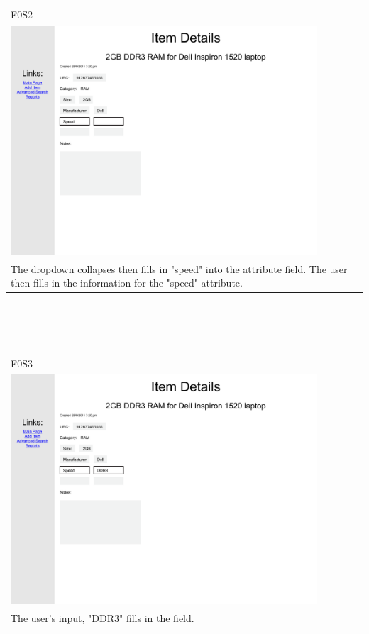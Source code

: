 \documentclass{article}
\begin{document}
~\\
~\\
\begin{tabular}{ p{4.5in} }
F0S2\\
\includegraphics[keepaspectratio, width=4.5in]{modifyDetailsF0S2.pdf} \\
The dropdown collapses then fills in "speed" into the attribute field. The user then fills in the information for the "speed" attribute.
\end{tabular}\\
~\\
~\\
\begin{tabular}{ p{4.5in} }
F0S3\\
\includegraphics[keepaspectratio, width=4.5in]{modifyDetailsF0S3.pdf} \\
The user's input, "DDR3" fills in the field.
\end{tabular}\\
\end{document}

